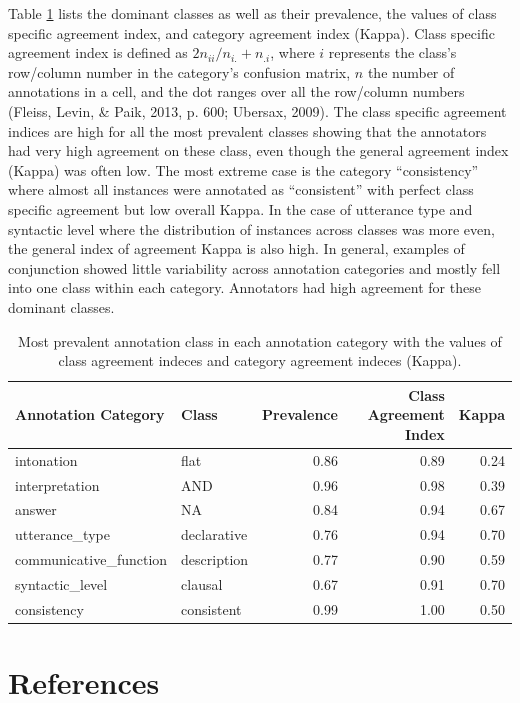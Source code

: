 \documentclass[
  english,
  ,man,floatsintext]{apa6}
\begin{document}
Table \ref{tab:andAgreeStats} lists the dominant classes as well as their prevalence, the values of class specific agreement index, and category agreement index (Kappa). Class specific agreement index is defined as \(2n_{ii}/n_{i.}+n_{.i}\), where \(i\) represents the class's row/column number in the category's confusion matrix, \(n\) the number of annotations in a cell, and the dot ranges over all the row/column numbers (Fleiss, Levin, \& Paik, 2013, p. 600; Ubersax, 2009). The class specific agreement indices are high for all the most prevalent classes showing that the annotators had very high agreement on these class, even though the general agreement index (Kappa) was often low. The most extreme case is the category ``consistency'' where almost all instances were annotated as ``consistent'' with perfect class specific agreement but low overall Kappa. In the case of utterance type and syntactic level where the distribution of instances across classes was more even, the general index of agreement Kappa is also high. In general, examples of conjunction showed little variability across annotation categories and mostly fell into one class within each category. Annotators had high agreement for these dominant classes.

\begin{table}

\caption{\label{tab:andAgreeStats}Most prevalent annotation class in each annotation category with the values of class agreement indeces and category agreement indeces (Kappa).}
\centering
\begin{tabular}[t]{l|l|r|r|r}
\hline
Annotation Category & Class & Prevalence & Class Agreement Index & Kappa\\
\hline
intonation & flat & 0.86 & 0.89 & 0.24\\
\hline
interpretation & AND & 0.96 & 0.98 & 0.39\\
\hline
answer & NA & 0.84 & 0.94 & 0.67\\
\hline
utterance\_type & declarative & 0.76 & 0.94 & 0.70\\
\hline
communicative\_function & description & 0.77 & 0.90 & 0.59\\
\hline
syntactic\_level & clausal & 0.67 & 0.91 & 0.70\\
\hline
consistency & consistent & 0.99 & 1.00 & 0.50\\
\hline
\end{tabular}
\end{table}

\hypertarget{references}{%
\section{References}\label{references}}
\end{document}
